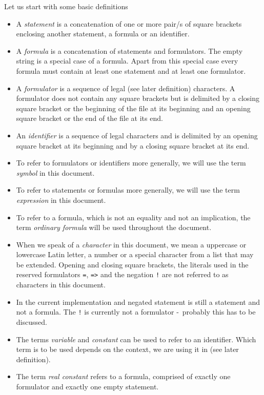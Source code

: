 \documentclass[british]{article}
\newcommand\prv{bc}
\newcommand\m[1]{\texttt{#1}}
\begin{document}
Let us start with some basic definitions
\begin{itemize}
\item A \emph{statement} is a concatenation of one or more pair/s of square
brackets enclosing another statement, a formula or an identifier.
\item A \emph{formula} is a concatenation of statements and formulators.
The empty string is a special case of a formula. Apart from this special
case every formula must contain at least one statement and at least
one formulator.
\item A \emph{formulator }is a sequence of legal (see later definition)
characters. A formulator does not contain any square brackets but
is delimited by a closing square bracket or the beginning of the file
at its beginning and an opening square bracket or the end of the file
at its end.
\item An \emph{identifier} is a sequence of legal characters and is delimited
by an opening square bracket at its beginning and by a closing square
bracket at its end.
\item To refer to formulators or identifiers more generally, we will use
the term \emph{symbol }in this document.
\item To refer to statements or formulas more generally, we will use the
term \emph{expression }in this document.
\item To refer to a formula, which is not an equality and not an implication, the term \emph{ordinary formula} will be used throughout the document.
\item When we speak of a \emph{character} in this document, we mean a uppercase
or lowercase Latin letter, a number or a special character from a
list that may be extended. Opening and closing square brackets, the
literals used in the reserved formulators \m{=}, \m{=>} and the
negation \m{!} are not referred to as characters in this document.
\item In the current implementation and negated statement is still a statement
and not a formula. The \m{!} is currently not a formulator -\ probably
this has to be discussed.
\item The terms \emph{variable} and \emph{constant} can be used to refer
to an identifier. Which term is to be used depends on the context,
we are using it in (see later definition).
\item The term \emph{real constant} refers to a formula, comprised of exactly
one formulator and exactly one empty statement.
\end{itemize}
\pagebreak{}
\end{document}
